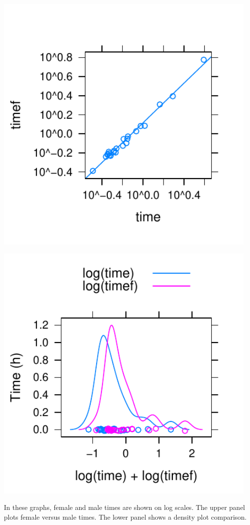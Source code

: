 \documentclass{tufte-book}\usepackage[]{graphicx}\usepackage[]{color}
\begin{document}
\begin{marginfigure}[-72pt]
\begin{Schunk}


\centerline{\includegraphics[width=0.98\textwidth]{figs/11-rec-logmf-1} }

\end{Schunk}
\begin{Schunk}


\centerline{\includegraphics[width=0.98\textwidth]{figs/11-skewtime-log-1} }

\end{Schunk}
\caption{In these graphs, female and male times are shown on log
  scales.  The upper panel plots female versus male times.
  The lower panel shows a
  density plot comparison.}\label{fig:skewtime-log}
\end{marginfigure}
\end{document}
